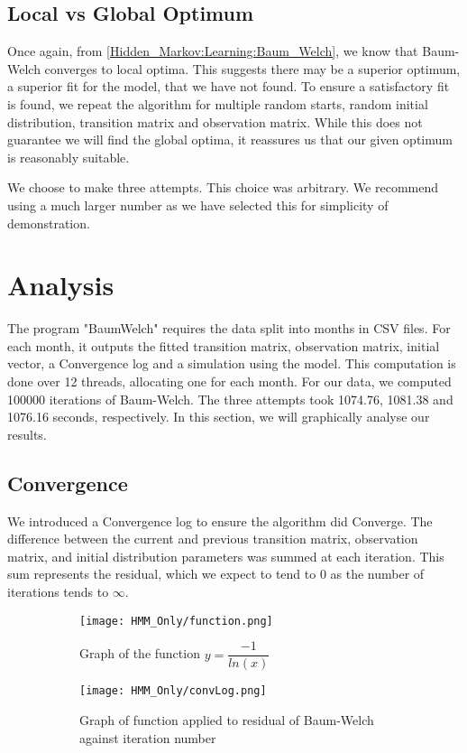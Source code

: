     \subsection{Local vs Global Optimum}
    \label{Simple_Rainfall_HMM:Baum_Welch:Local_vs_Global_Optimum}


    Once again, from \ref{Hidden_Markov:Learning:Baum_Welch}, we know that Baum-Welch converges to local optima. This suggests there may be a superior optimum, a superior fit for the model, that we have not found. To ensure a satisfactory fit is found, we repeat the algorithm for multiple random starts, random initial distribution, transition matrix and observation matrix. While this does not guarantee we will find the global optima, it reassures us that our given optimum is reasonably suitable. 


    We choose to make three attempts. This choice was arbitrary. We recommend using a much larger number as we have selected this for simplicity of demonstration.

\section{Analysis}
\label{Simple_Rainfall_HMM:Analysis}
The program "BaumWelch" requires the data split into months in CSV files. For each month, it outputs the fitted transition matrix, observation matrix, initial vector, a Convergence log and a simulation using the model. This computation is done over 12 threads, allocating one for each month. For our data, we computed 100000 iterations of Baum-Welch. The three attempts took 1074.76, 1081.38 and 1076.16 seconds, respectively. In this section, we will graphically analyse our results.

    \subsection{Convergence}
    \label{Simple_Rainfall_HMM:Analysis:Convergence}

    We introduced a Convergence log to ensure the algorithm did Converge. The difference between the current and previous transition matrix, observation matrix, and initial distribution parameters was summed at each iteration. This sum represents the residual, which we expect to tend to 0 as the number of iterations tends to $\infty$.

    \begin{figure}
        \begin{subfigure}{.45\textwidth}
        \centering
        \texttt{[image: HMM\_Only/function.png]}
        \caption{Graph of the function $ y = \dfrac{-1}{ln(x)}$}
        \label{func}
        \end{subfigure}
        \begin{subfigure}{.45\textwidth}
        \centering
        \texttt{[image: HMM\_Only/convLog.png]}
        \caption{Graph of function applied to residual of Baum-Welch against iteration number}
        \label{convlog}
        \end{subfigure}
        \caption{}
    \end{figure}

